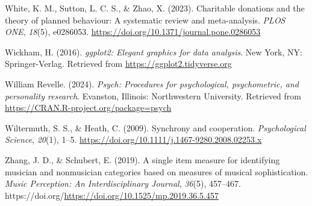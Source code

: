 \documentclass[
  man,floatsintext]{apa6}
\newlength{\cslhangindent}
\newenvironment{CSLReferences}[2] %
 {\begin{list}{}{%
  \setlength{\itemindent}{0pt}
  \setlength{\leftmargin}{0pt}
  \setlength{\parsep}{0pt}
  \ifodd #1
   \setlength{\leftmargin}{\cslhangindent}
   \setlength{\itemindent}{-1\cslhangindent}
  \fi
  \setlength{\itemsep}{#2\baselineskip}}}
 {\end{list}}
\begin{document}
\begin{CSLReferences}{1}{0}
White, K. M., Sutton, L. C. S., \& Zhao, X. (2023). Charitable donations and the theory of planned behaviour: {A} systematic review and meta-analysis. \emph{PLOS ONE}, \emph{18}(5), e0286053. \url{https://doi.org/10.1371/journal.pone.0286053}

Wickham, H. (2016). \emph{ggplot2: Elegant graphics for data analysis}. New York, NY: Springer-Verlag. Retrieved from \url{https://ggplot2.tidyverse.org}

William Revelle. (2024). \emph{Psych: Procedures for psychological, psychometric, and personality research}. Evanston, Illinois: Northwestern University. Retrieved from \url{https://CRAN.R-project.org/package=psych}

Wiltermuth, S. S., \& Heath, C. (2009). Synchrony and cooperation. \emph{Psychological Science}, \emph{20}(1), 1--5. \url{https://doi.org/10.1111/j.1467-9280.2008.02253.x}

Zhang, J. D., \& Schubert, E. (2019). A single item measure for identifying musician and nonmusician categories based on measures of musical sophistication. \emph{Music Perception: An Interdisciplinary Journal}, \emph{36}(5), 457--467. https://doi.org/\url{https://doi.org/10.1525/mp.2019.36.5.457}

\end{CSLReferences}
\end{document}
